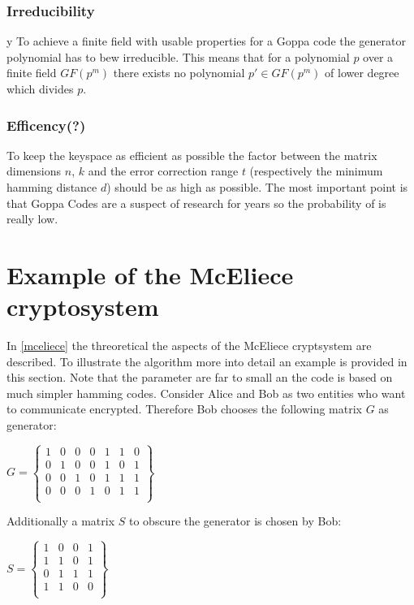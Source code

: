 \subsubsection*{Irreducibility} 
y
To achieve a finite field with usable properties for a Goppa code the generator polynomial has to bew irreducible. This means that for a polynomial $p$ over a finite field $GF(p^m)$ there exists no polynomial $p' \in GF(p^m)$ of lower degree which divides $p$.
 

\subsubsection*{Efficency(?)} To keep the keyspace as efficient as possible the factor between the matrix dimensions $n$, $k$ and the error correction range $t$ (respectively the minimum hamming distance $d$) should be as high as possible. The most important point is that Goppa Codes are a suspect of research for years so the probability of is really low. 




\section{Example of the McEliece cryptosystem}
\label{example}
In \autoref{mceliece} the threoretical the aspects of the McEliece cryptsystem are described. To illustrate the algorithm more into detail an example is provided in this section. Note that the parameter are far to small an the code is based on much simpler hamming codes.
\newline
Consider Alice and Bob as two entities who want to communicate encrypted. 
Therefore Bob chooses the following matrix $G$ as generator: 
\begin{center}
$
G =
\begin{Bmatrix}
1 & 0 & 0 & 0 & 1 & 1 & 0 \\
0 & 1 & 0 & 0 & 1 & 0 & 1 \\
0 & 0 & 1 & 0 & 1 & 1 & 1 \\
0 & 0 & 0 & 1 & 0 & 1 & 1 \\
\end{Bmatrix}
$
\end{center}
Additionally a matrix  $S$ to obscure the generator is chosen by Bob:
\begin{center}
	$
	S =
	\begin{Bmatrix}
	1 & 0 & 0 & 1 \\
	1 & 1 & 0 & 1 \\
	0 & 1 & 1 & 1 \\
	1 & 1 & 0 & 0 \\
	\end{Bmatrix}
	$
\end{center}

